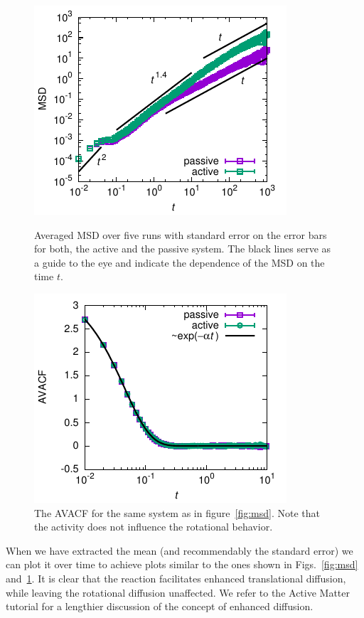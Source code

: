 \documentclass[aip,jcp,reprint,a4paper,onecolumn,nofootinbib,amsmath,amssymb]{revtex4-1}
\begin{document}
\begin{figure}[tb]
  \centering
  \leavevmode\hfill
  \begin{minipage}[t]{.45\linewidth}
    \centering
    \includegraphics{FIGURES/msd}
    \caption{Averaged MSD over five runs with standard error on the
      error bars for both, the active and the passive system. The
      black lines serve as a guide to the eye and indicate the
      dependence of the MSD on the time $t$.}
    \label{fig:msd}
  \end{minipage}
  \hfill
  \begin{minipage}[t]{.45\linewidth}
    \centering
    \includegraphics{FIGURES/avacf}
    \caption{The AVACF for the same system as in
      figure~\ref{fig:msd}. Note that the activity does not influence
      the rotational behavior.}
    \label{fig:avacf}
  \end{minipage}
  \hfill\null
\end{figure}

When we have extracted the mean (and recommendably the standard error) we can plot it over time to achieve plots similar to the ones shown in Figs.~\ref{fig:msd} and~\ref{fig:avacf}. It is clear that the reaction facilitates enhanced translational diffusion, while leaving the rotational diffusion unaffected. We refer to the Active Matter tutorial for a lengthier discussion of the concept of enhanced diffusion.
\end{document}
